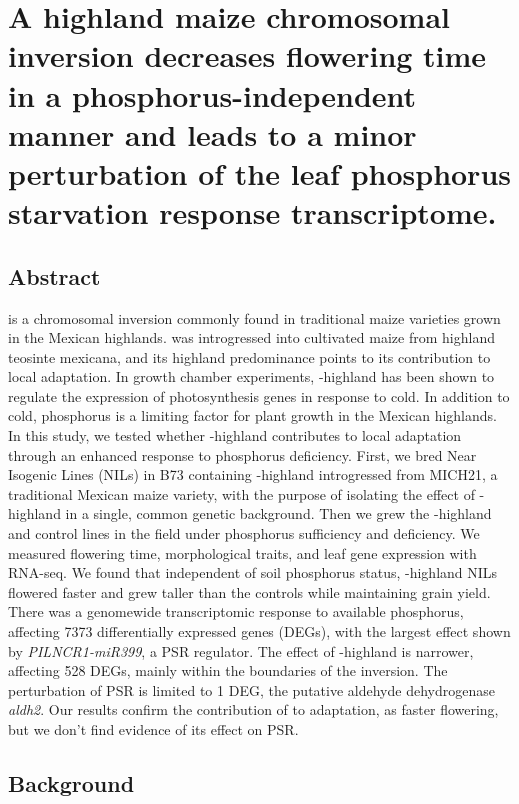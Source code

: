 \chapter{A highland maize chromosomal inversion decreases flowering time in a phosphorus-independent manner and leads to a minor perturbation of the leaf phosphorus starvation response transcriptome.}
\label{chap-three}
\newrefsection

\section{Abstract}
\invfour is a chromosomal inversion commonly found in traditional maize varieties grown in the Mexican highlands. 
\invfour was introgressed into cultivated maize from highland teosinte mexicana, and its highland predominance points to its contribution to local adaptation. 
In growth chamber experiments, \invfour-highland has been shown to regulate the expression of photosynthesis genes in response to cold.
In addition to cold, phosphorus is a limiting factor for plant growth in the Mexican highlands. 
In this study, we tested whether \invfour-highland contributes to local adaptation through an enhanced response to phosphorus deficiency. 
First, we bred Near Isogenic Lines (NILs) in B73 containing \invfour-highland introgressed from MICH21, a traditional Mexican maize variety, with the purpose of isolating the effect of \invfour-highland in a single, common genetic background.
Then we grew the \invfour-highland and control lines in the field under phosphorus sufficiency and deficiency. 
We measured flowering time, morphological traits, and leaf gene expression with RNA-seq. We found that independent of soil phosphorus status, \invfour-highland NILs flowered faster and grew taller than the controls while maintaining grain yield. 
There was a genomewide transcriptomic response to available phosphorus, affecting 7373 differentially expressed genes (DEGs), with the largest effect shown by \textit{PILNCR1-miR399}, a PSR regulator. The effect of \invfour-highland is narrower, affecting 528 DEGs, mainly within the boundaries of the inversion. The \invfour perturbation of PSR is limited to 1 DEG, the putative aldehyde dehydrogenase \textit{aldh2}. 
Our results confirm the contribution of \invfour to adaptation, as faster flowering, but we don’t find evidence of its effect on PSR.

\section{Background}

